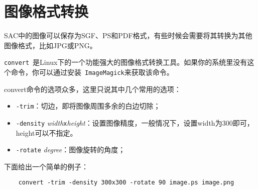 \section{图像格式转换}
\label{sec:format-conversion}

SAC中的图像可以保存为SGF、PS和PDF格式，有些时候会需要将其转换为其他图像格式，比如JPG或PNG。

\verb+convert+~是Linux下的一个功能强大的图像格式转换工具。如果你的系统里没有这个命令，你可以通过安装~\verb+ImageMagick+来获取该命令。

convert命令的选项众多，这里只说其中几个常用的选项：

\begin{itemize}
\item \verb+-trim+：切边，即将图像周围多余的白边切除；
\item \verb+-density+ \textit{width}\verb+x+\textit{height}：设置图像精度，一般情况下，设置width为300即可，height可以不指定。
\item \verb+-rotate+ \textit{degree}：图像旋转的角度；
\end{itemize}

下面给出一个简单的例子：

\begin{verbatim}
    convert -trim -density 300x300 -rotate 90 image.ps image.png
\end{verbatim}

